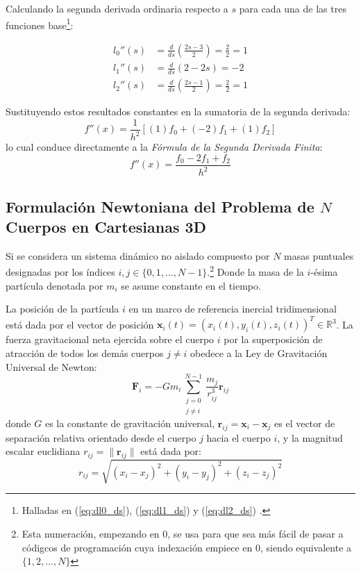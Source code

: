 \documentclass[11pt, a4paper]{article}
\begin{document}
	
	Calculando la segunda derivada ordinaria respecto a $s$ para cada una de las tres funciones base\footnote{Halladas en (\ref{eq:dl0_ds}), (\ref{eq:dl1_ds}) y (\ref{eq:dl2_ds}) .}:
	
	\begin{align}
		l_0''(s) &= \frac{d}{ds} \left( \frac{2s - 3}{2} \right) = \frac{2}{2} = 1 \\
		l_1''(s) &= \frac{d}{ds} \left( 2 - 2s \right) = -2 \\
		l_2''(s) &= \frac{d}{ds} \left( \frac{2s - 1}{2} \right) = \frac{2}{2} = 1
	\end{align}
	
	Sustituyendo estos resultados constantes en la sumatoria de la segunda derivada:
	\begin{equation}
		f''(x) = \frac{1}{h^2} \left[ (1) f_0 + (-2) f_1 + (1) f_2 \right]
	\end{equation}
	lo cual conduce directamente a la \textit{Fórmula de la Segunda Derivada Finita}:
	\begin{equation}
		f''(x) = \frac{f_0 - 2f_1 + f_2}{h^2}
		\label{eq:second_deriv_formula}
	\end{equation}
	
	\subsection{Formulación Newtoniana del Problema de $N$ Cuerpos en Cartesianas 3D}
	
	Si se considera un sistema dinámico no aislado compuesto por $N$ masas puntuales designadas por los índices $i, j \in \{0, 1, \dots, N-1\}$.\footnote{Esta numeración, empezando en 0, se usa para que sea más fácil de pasar a códigcos de programación cuya indexación empiece en 0, siendo equivalente a $\{1, 2, \dots, N\}$} Donde la masa de la $i$-ésima partícula denotada por $m_i$ se asume constante en el tiempo.
	
	La posición de la partícula $i$ en un marco de referencia inercial tridimensional está dada por el vector de posición $\mathbf{x}_i(t) = (x_i(t), y_i(t), z_i(t))^T \in \mathbb{R}^3$. La fuerza gravitacional neta ejercida sobre el cuerpo $i$ por la superposición de atracción de todos los demás cuerpos $j \neq i$ obedece a la Ley de Gravitación Universal de Newton:
	\begin{equation}
		\mathbf{F}_i = -G m_i \sum_{\substack{j=0 \\ j \neq i}}^{N-1} \frac{m_j}{r_{ij}^3} \mathbf{r}_{ij}
	\end{equation}
	donde $G$ es la constante de gravitación universal, $\mathbf{r}_{ij} = \mathbf{x}_i - \mathbf{x}_j$ es el vector de separación relativa orientado desde el cuerpo $j$ hacia el cuerpo $i$, y la magnitud escalar euclidiana $r_{ij} = \|\mathbf{r}_{ij}\|$ está dada por:
	\begin{equation}
		r_{ij} = \sqrt{(x_i - x_j)^2 + (y_i - y_j)^2 + (z_i - z_j)^2}
	\end{equation}
	
\end{document}
